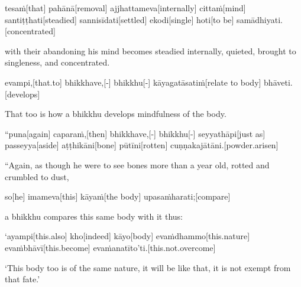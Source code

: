 \begin{samepage}
\begingl[glneveryline={\PaliGlossA,\PaliGlossB}]
tesaṁ[that] pahānā[removal] ajjhattameva[internally] cittaṁ[mind] santiṭṭhati[steadied] sannisīdati[settled] ekodi[single] hoti[to be] samādhiyati.[concentrated]
\endgl
\nopagebreak
\linespread{0.5}
\begin{spacin}{0.2}
{\PaliGlossFT with their abandoning his mind becomes steadied internally, quieted, brought to singleness, and concentrated.}
\end{spacin}
\vskip 12pt
\end{samepage}
\begin{samepage}
\begingl[glneveryline={\PaliGlossA,\PaliGlossB}]
evampi,[that.to] bhikkhave,[-] bhikkhu[-] kāyagatāsatiṁ[relate to body] bhāveti.[develops]
\endgl
\nopagebreak
\linespread{0.5}
\begin{spacin}{0.2}
{\PaliGlossFT That too is how a bhikkhu develops mindfulness of the body.}
\end{spacin}
\vskip 12pt
\end{samepage}
\vskip 0.05in
\begin{samepage}
\begingl[glneveryline={\PaliGlossA,\PaliGlossB}]
“puna[again] caparaṁ,[then] bhikkhave,[-] bhikkhu[-] seyyathāpi[just as] passeyya[aside] aṭṭhikāni[bone] pūtīni[rotten] cuṇṇakajātāni.[powder.arisen]
\endgl
\nopagebreak
\linespread{0.5}
\begin{spacin}{0.2}
{\PaliGlossFT “Again, as though he were to see bones more than a year old, rotted and crumbled to dust,}
\end{spacin}
\vskip 12pt
\end{samepage}
\begin{samepage}
\begingl[glneveryline={\PaliGlossA,\PaliGlossB}]
so[he] imameva[this] kāyaṁ[the body] upasaṁharati;[compare]
\endgl
\nopagebreak
\linespread{0.5}
\begin{spacin}{0.2}
{\PaliGlossFT a bhikkhu compares this same body with it thus:}
\end{spacin}
\vskip 12pt
\end{samepage}
\begin{samepage}
\begingl[glneveryline={\PaliGlossA,\PaliGlossB}]
‘ayampi[this.also] kho[indeed] kāyo[body] evaṁdhammo[this.nature] evaṁbhāvī[this.become] evaṁanatīto’ti.[this.not.overcome]
\endgl
\nopagebreak
\linespread{0.5}
\begin{spacin}{0.2}
{\PaliGlossFT ‘This body too is of the same nature, it will be like that, it is not exempt from that fate.’}
\end{spacin}
\vskip 12pt
\end{samepage}
